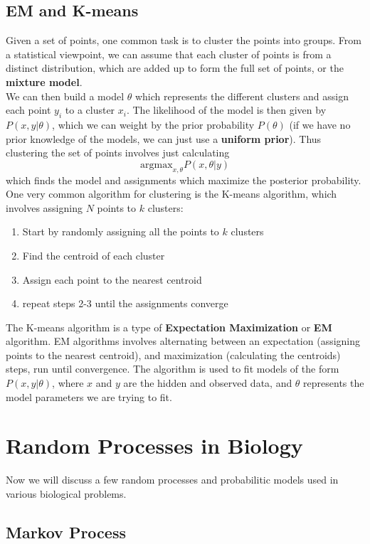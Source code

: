 \documentclass[12pt]{article}
\begin{document}
\subsection{EM and K-means}
Given a set of points, one common task is to cluster the points into groups. From a statistical viewpoint, we can assume that each cluster of points is from a distinct distribution, which are added up to form the full set of points, or the \textbf{mixture model}.\\[10pt]
We can then build a model $\theta$ which represents the different clusters and assign each point $y_i$ to a cluster $x_i$. The likelihood of the model is then given by $P(x,y|\theta)$, which we can weight by the prior probability $P(\theta)$ (if we have no prior knowledge of the models, we can just use a \textbf{uniform prior}). Thus clustering the set of points involves just calculating $$
\text{argmax}_{x,\theta} P(x,\theta|y)$$ which finds the model and assignments which maximize the posterior probability.\\[10pt]
One very common algorithm for clustering is the K-means algorithm, which involves assigning $N$ points to $k$ clusters:
\begin{enumerate}
    \item Start by randomly assigning all the points to $k$ clusters
    \item Find the centroid of each cluster
    \item Assign each point to the nearest centroid
    \item repeat steps 2-3 until the assignments converge
\end{enumerate}
The K-means algorithm is a type of \textbf{Expectation Maximization} or \textbf{EM} algorithm. EM algorithms involves alternating between an expectation (assigning points to the nearest centroid), and maximization (calculating the centroids) steps, run until convergence. The algorithm is used to fit models of the form $P(x,y|\theta)$, where $x$ and $y$ are the hidden and observed data, and $\theta$ represents the model parameters we are trying to fit.

\section{Random Processes in Biology}
Now we will discuss a few random processes and probabilitic models used in various biological problems.
\subsection{Markov Process}
\end{document}

